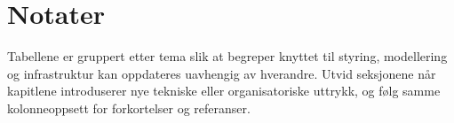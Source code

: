 \section{Notater}
Tabellene er gruppert etter tema slik at begreper knyttet til styring, modellering og infrastruktur kan oppdateres uavhengig av hverandre. Utvid seksjonene når kapitlene introduserer nye tekniske eller organisatoriske uttrykk, og følg samme kolonneoppsett for forkortelser og referanser.
